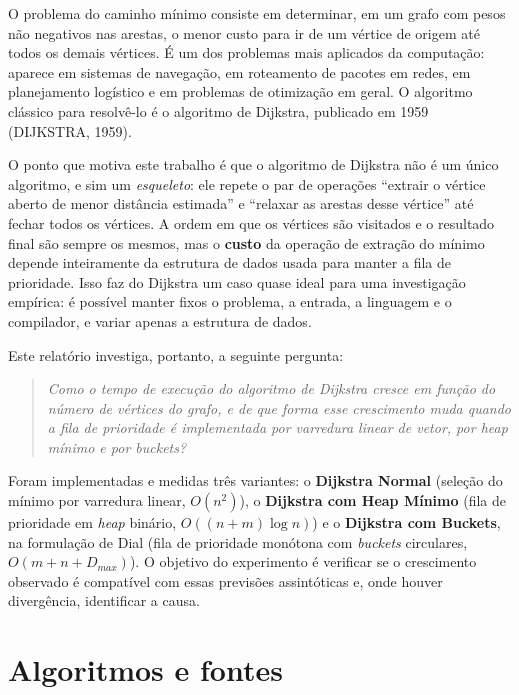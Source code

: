 \documentclass[12pt,a4paper]{article}
\begin{document}
O problema do caminho mínimo consiste em determinar, em um grafo com pesos
não negativos nas arestas, o menor custo para ir de um vértice de origem até
todos os demais vértices. É um dos problemas mais aplicados da computação:
aparece em sistemas de navegação, em roteamento de pacotes em redes, em
planejamento logístico e em problemas de otimização em geral. O algoritmo
clássico para resolvê-lo é o algoritmo de Dijkstra, publicado em 1959
(DIJKSTRA, 1959).

O ponto que motiva este trabalho é que o algoritmo de Dijkstra não é um único
algoritmo, e sim um \emph{esqueleto}: ele repete o par de operações
``extrair o vértice aberto de menor distância estimada'' e ``relaxar as
arestas desse vértice'' até fechar todos os vértices. A ordem em que os
vértices são visitados e o resultado final são sempre os mesmos, mas o
\textbf{custo} da operação de extração do mínimo depende inteiramente da
estrutura de dados usada para manter a fila de prioridade. Isso faz do
Dijkstra um caso quase ideal para uma investigação empírica: é possível
manter fixos o problema, a entrada, a linguagem e o compilador, e variar
apenas a estrutura de dados.

Este relatório investiga, portanto, a seguinte pergunta:

\begin{quote}
\itshape Como o tempo de execução do algoritmo de Dijkstra cresce em função
do número de vértices do grafo, e de que forma esse crescimento muda quando
a fila de prioridade é implementada por varredura linear de vetor, por
\emph{heap} mínimo e por \emph{buckets}?
\end{quote}

Foram implementadas e medidas três variantes: o \textbf{Dijkstra Normal}
(seleção do mínimo por varredura linear, $O(n^2)$), o \textbf{Dijkstra com
Heap Mínimo} (fila de prioridade em \emph{heap} binário, $O((n+m)\log n)$) e
o \textbf{Dijkstra com Buckets}, na formulação de Dial (fila de prioridade
monótona com \emph{buckets} circulares, $O(m + n + D_{max})$). O objetivo do
experimento é verificar se o crescimento observado é compatível com essas
previsões assintóticas e, onde houver divergência, identificar a causa.

\section{Algoritmos e fontes}
\end{document}
